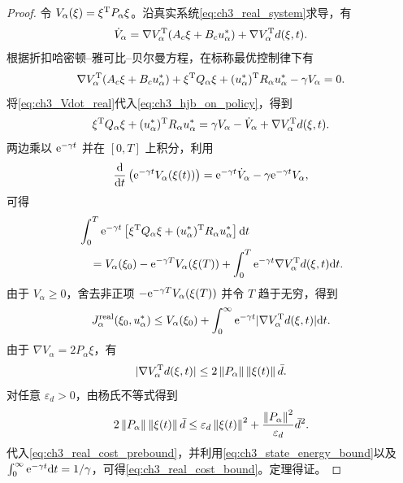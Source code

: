 \begin{proof}
令 $V_\alpha(\xi)=\xi^{\mathrm{T}}P_\alpha\xi$。沿真实系统\eqref{eq:ch3_real_system}求导，有
\begin{equation}
  \dot V_\alpha=\nabla V_\alpha^{\mathrm{T}}(A_c\xi+B_cu_\alpha^*)+\nabla V_\alpha^{\mathrm{T}}d(\xi,t).
  \label{eq:ch3_Vdot_real}
\end{equation}
根据折扣哈密顿--雅可比--贝尔曼方程，在标称最优控制律下有
\begin{equation}
  \nabla V_\alpha^{\mathrm{T}}(A_c\xi+B_cu_\alpha^*)+\xi^{\mathrm{T}}Q_\alpha\xi+(u_\alpha^*)^{\mathrm{T}}R_\alpha u_\alpha^*-\gamma V_\alpha=0 .
  \label{eq:ch3_hjb_on_policy}
\end{equation}
将\eqref{eq:ch3_Vdot_real}代入\eqref{eq:ch3_hjb_on_policy}，得到
\begin{equation}
  \xi^{\mathrm{T}}Q_\alpha\xi+(u_\alpha^*)^{\mathrm{T}}R_\alpha u_\alpha^*=\gamma V_\alpha-\dot V_\alpha+\nabla V_\alpha^{\mathrm{T}}d(\xi,t).
  \label{eq:ch3_stage_real}
\end{equation}
两边乘以 $\mathrm{e}^{-\gamma t}$ 并在 $[0,T]$ 上积分，利用
\begin{equation}
  \frac{\mathrm{d}}{\mathrm{d} t}\left(\mathrm{e}^{-\gamma t}V_\alpha(\xi(t))\right)=\mathrm{e}^{-\gamma t}\dot V_\alpha-\gamma\mathrm{e}^{-\gamma t}V_\alpha,
\end{equation}
可得
\begin{align}
  &\int_0^T\mathrm{e}^{-\gamma t}\left[\xi^{\mathrm{T}}Q_\alpha\xi+(u_\alpha^*)^{\mathrm{T}}R_\alpha u_\alpha^*\right]\mathrm{d} t \\
  &\quad =V_\alpha(\xi_0)-\mathrm{e}^{-\gamma T}V_\alpha(\xi(T))+\int_0^T\mathrm{e}^{-\gamma t}\nabla V_\alpha^{\mathrm{T}}d(\xi,t)\mathrm{d} t .
\end{align}
由于 $V_\alpha\ge0$，舍去非正项 $-\mathrm{e}^{-\gamma T}V_\alpha(\xi(T))$ 并令 $T$ 趋于无穷，得到
\begin{equation}
  J_\alpha^{\mathrm{real}}(\xi_0,u_\alpha^*)\le V_\alpha(\xi_0)+\int_0^\infty\mathrm{e}^{-\gamma t}|\nabla V_\alpha^{\mathrm{T}}d(\xi,t)|\mathrm{d} t .
  \label{eq:ch3_real_cost_prebound}
\end{equation}
由于 $\nabla V_\alpha=2P_\alpha\xi$，有
\begin{equation}
  |\nabla V_\alpha^{\mathrm{T}}d(\xi,t)|\le2\left\lVert P_\alpha\right\rVert\left\lVert \xi(t)\right\rVert\bar d .
\end{equation}
对任意 $\varepsilon_d>0$，由杨氏不等式得到
\begin{equation}
  2\left\lVert P_\alpha\right\rVert\left\lVert \xi(t)\right\rVert\bar d\le \varepsilon_d\left\lVert \xi(t)\right\rVert^2+\frac{\left\lVert P_\alpha\right\rVert^2}{\varepsilon_d}\bar d^2 .
\end{equation}
代入\eqref{eq:ch3_real_cost_prebound}，并利用\eqref{eq:ch3_state_energy_bound}以及 $\int_0^\infty \mathrm{e}^{-\gamma t}\mathrm{d} t=1/\gamma$，可得\eqref{eq:ch3_real_cost_bound}。定理得证。
\end{proof}

